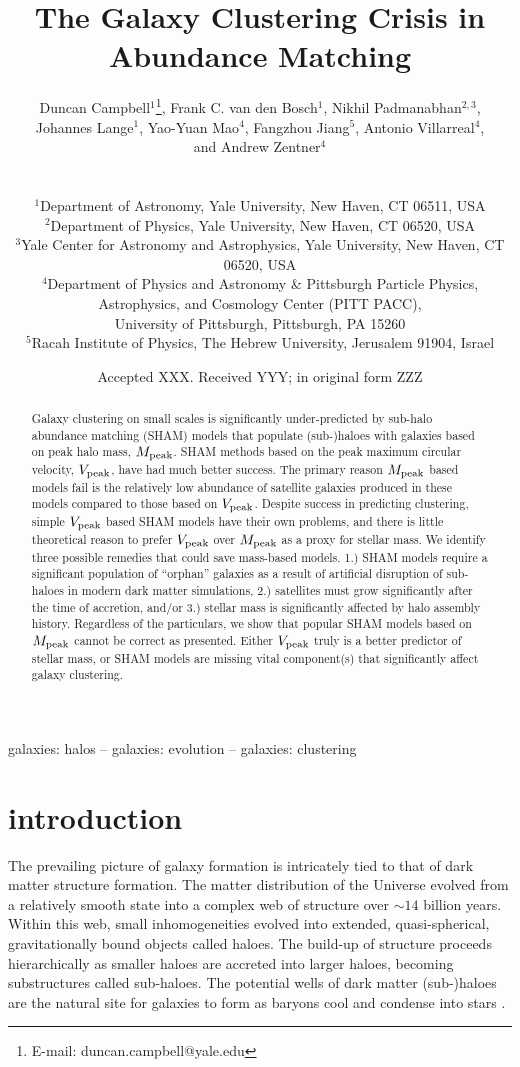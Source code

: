 \documentclass[a4paper,fleqn,usenatbib]{mnras}
\title[The Galaxy Clustering Crisis]{The Galaxy Clustering Crisis in Abundance Matching}
\author[Campbell et al.]
{\parbox[t]{\textwidth}{
Duncan Campbell$^{1}$\thanks{E-mail: duncan.campbell@yale.edu},
Frank C. van den Bosch$^{1}$,
Nikhil Padmanabhan$^{2, 3}$,\\ 
Johannes Lange$^{1}$,
Yao-Yuan Mao$^{4}$, 
Fangzhou Jiang$^{5}$,
Antonio Villarreal$^{4}$,\\
and Andrew Zentner$^{4}$
} \\
\vspace*{3pt} \\
$^{1}$Department of Astronomy, Yale University, New Haven, CT 06511, USA\\
$^{2}$Department of Physics, Yale University, New Haven, CT 06520, USA \\
$^{3}$Yale Center for Astronomy and Astrophysics, Yale University, New Haven, CT 06520, USA\\
$^{4}$Department of Physics and Astronomy \& Pittsburgh Particle Physics, Astrophysics, and Cosmology Center (PITT PACC),\\ University of Pittsburgh, Pittsburgh, PA 15260\\
$^{5}$Racah Institute of Physics, The Hebrew University, Jerusalem 91904, Israel
}
\date{Accepted XXX. Received YYY; in original form ZZZ}
\begin{document}
\label{firstpage}
\pagerange{\pageref{firstpage}--\pageref{lastpage}}
\maketitle

\begin{abstract}
Galaxy clustering on small scales is significantly under-predicted by sub-halo abundance matching (SHAM) models that populate (sub-)haloes with galaxies based on peak halo mass, $M_{\rm peak}$.  SHAM methods based on the peak maximum circular velocity, $V_{\rm peak}$, have had much better success.  The primary reason $M_{\rm peak}$ based models fail is the relatively low abundance of satellite galaxies produced in these models compared to those based on $V_{\rm peak}$.  Despite success in predicting clustering, simple $V_{\rm peak}$ based SHAM models have their own problems, and there is little theoretical reason to prefer $V_{\rm peak}$ over $M_{\rm peak}$ as a proxy for stellar mass.  We identify three possible remedies that could save mass-based models.  1.) SHAM models require a significant population of ``orphan'' galaxies as a result of artificial disruption of sub-haloes in modern dark matter simulations, 2.) satellites must grow significantly after the time of accretion, and/or 3.) stellar mass is significantly affected by halo assembly history.  Regardless of the particulars, we show that popular SHAM models based on $M_{\rm peak}$ cannot be correct as presented.  Either $V_{\rm peak}$ truly is a better predictor of stellar mass, or SHAM models are missing vital component(s) that significantly affect galaxy clustering.
\end{abstract}

\begin{keywords}
galaxies: halos -- galaxies: evolution -- galaxies: clustering
\end{keywords}

\section{introduction}

The prevailing picture of galaxy formation is intricately tied to that of dark matter structure formation.  The matter distribution of the Universe evolved from a relatively smooth state into a complex web of structure over $\sim 14$ billion years.  Within this web, small inhomogeneities evolved into extended, quasi-spherical, gravitationally bound objects called haloes.  The build-up of structure proceeds hierarchically as smaller haloes are accreted into larger haloes, becoming substructures called sub-haloes.  The potential wells of dark matter (sub-)haloes are the natural site for galaxies to form as baryons cool and condense into stars \citep{Rees:1977gr, White:1978uk, Fall:1980br}.  
\end{document}
